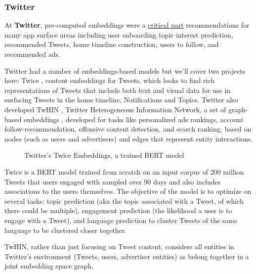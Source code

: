 \documentclass[11pt, table]{diazessay} %
\begin{document}
\begin{sloppypar}
\subsubsection{Twitter}
At \textbf{Twitter},  pre-computed embeddings were a \href{https://blog.twitter.com/engineering/en_us/topics/insights/2018/embeddingsattwitter}{critical part} recommendations for many app surface areas including user onboarding topic interest prediction, recommended Tweets, home timeline construction, users to follow, and recommended ads.

Twitter had a number of embeddings-based models but we'll cover two projects here: Twice \citep{liu2022twice}, content embeddings for Tweets, which looks to find rich representations of Tweets that include both text and visual data for use in surfacing Tweets in the home timeline, Notifications and Topics. Twitter also developed TwHIN \citep{el2022twhin}, Twitter Heterogeneous Information Network, a set of graph-based embeddings \citep{el2022twhin}, developed for tasks like personalized ads rankings, account follow-recommendation, offensive content detection, and search ranking, based on nodes (such as users and advertisers) and edges that represent entity interactions.

\begin{figure}[H]
\caption{Twitter's Twice Embeddings, a trained BERT model \citep{liu2022twice}}
\end{figure}


Twice is a BERT model trained from scratch on an input corpus of 200 million Tweets that users engaged with sampled over 90 days and also includes associations to the users themselves. The objective of the model is to optimize on several tasks: topic prediction (aka the topic associated with a Tweet, of which there could be multiple), engagement prediction (the likelihood a user is to engage with a Tweet), and language prediction to cluster Tweets of the same language to be clustered closer together.


TwHIN, rather than just focusing on Tweet content, considers all entities in Twitter's environment (Tweets, users, advertiser entities) as belong together in a joint embedding space graph.


\end{sloppypar}
\end{document}
